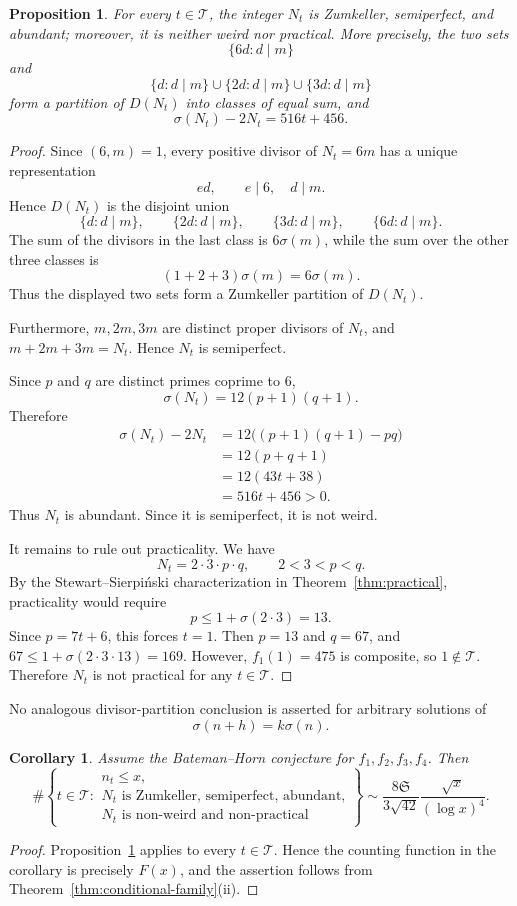 \documentclass[11pt,reqno]{amsart}
\numberwithin{equation}{section}
\theoremstyle{plain}
\newtheorem{proposition}[theorem]{Proposition}
\newtheorem{corollary}[theorem]{Corollary}
\theoremstyle{definition}
\theoremstyle{remark}
\begin{document}
\begin{proposition}\label{prop:structural-family}
For every $t\in\mathcal T$, the integer $N_t$ is Zumkeller, semiperfect, and abundant; moreover, it is neither weird nor practical. More precisely, the two sets
\[
\{6d:d\mid m\}
\]
and
\[
\{d:d\mid m\}\cup\{2d:d\mid m\}\cup\{3d:d\mid m\}
\]
form a partition of $D(N_t)$ into classes of equal sum, and
\[
\sigma(N_t)-2N_t=516t+456.
\]
\end{proposition}
\begin{proof}
Since $(6,m)=1$, every positive divisor of $N_t=6m$ has a unique representation
\[
ed,\qquad e\mid6,\quad d\mid m.
\]
Hence $D(N_t)$ is the disjoint union
\[
\{d:d\mid m\},\qquad
\{2d:d\mid m\},\qquad
\{3d:d\mid m\},\qquad
\{6d:d\mid m\}.
\]
The sum of the divisors in the last class is $6\sigma(m)$, while the sum over the other three classes is
\[
(1+2+3)\sigma(m)=6\sigma(m).
\]
Thus the displayed two sets form a Zumkeller partition of $D(N_t)$.

Furthermore, $m,2m,3m$ are distinct proper divisors of $N_t$, and
$m+2m+3m=N_t$. Hence $N_t$ is semiperfect.

Since $p$ and $q$ are distinct primes coprime to $6$,
\[
\sigma(N_t)=12(p+1)(q+1).
\]
Therefore
\[
\begin{aligned}
\sigma(N_t)-2N_t
&=12\bigl((p+1)(q+1)-pq\bigr)\\
&=12(p+q+1)\\
&=12(43t+38)\\
&=516t+456>0.
\end{aligned}
\]
Thus $N_t$ is abundant. Since it is semiperfect, it is not weird.

It remains to rule out practicality. We have
\[
N_t=2\cdot3\cdot p\cdot q,
\qquad
2<3<p<q.
\]
By the Stewart--Sierpi\'nski characterization in Theorem~\ref{thm:practical}, practicality would require
\[
p\le1+\sigma(2\cdot3)=13.
\]
Since $p=7t+6$, this forces $t=1$. Then $p=13$ and $q=67$, and
$67\le1+\sigma(2\cdot3\cdot13)=169$. However,
$f_1(1)=475$ is composite, so $1\notin\mathcal T$. Therefore $N_t$ is not practical for any $t\in\mathcal T$.
\end{proof}

No analogous divisor-partition conclusion is asserted for arbitrary solutions of
\[
\sigma(n+h)=k\sigma(n).
\]

\begin{corollary}\label{cor:structural-BH}
Assume the Bateman--Horn conjecture for $f_1,f_2,f_3,f_4$. Then
\[
\#\left\{t\in\mathcal T:
\begin{array}{l}
n_t\le x,\\
N_t\text{ is Zumkeller, semiperfect, abundant,}\\
N_t\text{ is non-weird and non-practical}
\end{array}
\right\}
\sim
\frac{8\mathfrak S}{3\sqrt{42}}\frac{\sqrt{x}}{(\log x)^4}.
\]
\end{corollary}
\begin{proof}
Proposition~\ref{prop:structural-family} applies to every $t\in\mathcal T$. Hence the counting function in the corollary is precisely $F(x)$, and the assertion follows from Theorem~\ref{thm:conditional-family}\textup{(ii)}.
\end{proof}
\end{document}
